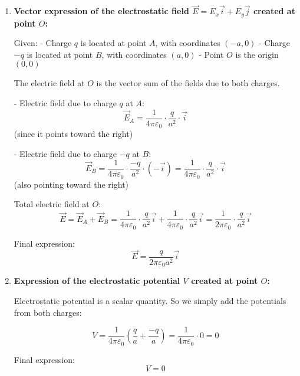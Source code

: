 \documentclass[12pt]{article}
\begin{document}
\begin{answerbox}
    \begin{enumerate}
        \item \textbf{Vector expression of the electrostatic field $ \vec{E} = E_x \vec{i} + E_y \vec{j} $ created at point $ O $:}
    
        Given:
        - Charge $ q $ is located at point $ A $, with coordinates $ (-a, 0) $
        - Charge $ -q $ is located at point $ B $, with coordinates $ (a, 0) $
        - Point $ O $ is the origin $ (0, 0) $
    
        The electric field at $ O $ is the vector sum of the fields due to both charges.
    
        
            
    - Electric field due to charge $ q $ at $ A $:
            $$
            \vec{E}_A = \frac{1}{4\pi\varepsilon_0} \cdot \frac{q}{a^2} \cdot \vec{i}
            $$
            (since it points toward the right)
    
            
    - Electric field due to charge $ -q $ at $ B $:
            $$
            \vec{E}_B = \frac{1}{4\pi\varepsilon_0} \cdot \frac{-q}{a^2} \cdot (-\vec{i}) = \frac{1}{4\pi\varepsilon_0} \cdot \frac{q}{a^2} \cdot \vec{i}
            $$
            (also pointing toward the right)
        
    
        Total electric field at $ O $:
        $$
        \vec{E} = \vec{E}_A + \vec{E}_B = \frac{1}{4\pi\varepsilon_0} \cdot \frac{q}{a^2} \vec{i} + \frac{1}{4\pi\varepsilon_0} \cdot \frac{q}{a^2} \vec{i} = \frac{1}{2\pi\varepsilon_0} \cdot \frac{q}{a^2} \vec{i}
        $$
    
        Final expression:
        $$
        \boxed{\vec{E} = \frac{q}{2\pi\varepsilon_0 a^2} \vec{i}}
        $$
    
        \item \textbf{Expression of the electrostatic potential $ V $ created at point $ O $:}
    
        Electrostatic potential is a scalar quantity. So we simply add the potentials from both charges:
    
        $$
        V = \frac{1}{4\pi\varepsilon_0} \left( \frac{q}{a} + \frac{-q}{a} \right) = \frac{1}{4\pi\varepsilon_0} \cdot 0 = 0
        $$
    
        Final expression:
        $$
        \boxed{V = 0}
        $$
    \end{enumerate}
\end{answerbox}
\end{document}
